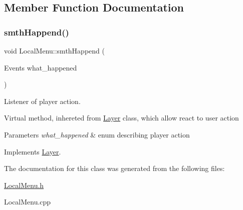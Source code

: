 \subsection{Member Function Documentation}
\mbox{\label{class_local_menu_ad6db1f0ae5757a4e25269d40f6e369af}} 
\subsubsection{\texorpdfstring{smth\+Happend()}{smthHappend()}}
{\footnotesize\ttfamily void Local\+Menu\+::smth\+Happend (\begin{DoxyParamCaption}\item[{Events}]{what\+\_\+happened }\end{DoxyParamCaption})\hspace{0.3cm}{\ttfamily [virtual]}}



Listener of player action. 

Virtual method, inhereted from \hyperlink{class_layer}{Layer} class, which allow react to user action 
\begin{DoxyParams}{Parameters}
{\em what\+\_\+happened} & enum describing player action \\
\hline
\end{DoxyParams}


Implements \hyperlink{class_layer}{Layer}.



The documentation for this class was generated from the following files\+:\begin{DoxyCompactItemize}
\item 
\hyperlink{_local_menu_8h}{Local\+Menu.\+h}\item 
Local\+Menu.\+cpp\end{DoxyCompactItemize}
